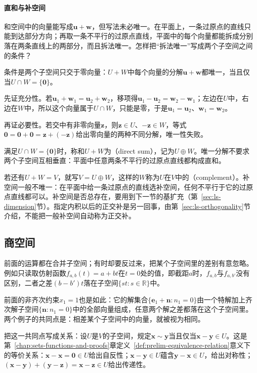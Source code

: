 \paragraph{直和与补空间}
\label{sec:ls-direct-sum}
和空间中的向量能写成$\bm u+\bm w$，但写法未必唯一。在平面上，一条过原点的直线只能到达部分方向；再取一条不平行的过原点直线，平面中的每个向量都能拆成分别落在两条直线上的两部分，而且拆法唯一。怎样把“拆法唯一”写成两个子空间之间的条件？

条件是两个子空间只交于零向量：$U+W$中每个向量的分解$\bm u+\bm w$都唯一，当且仅当$U\cap W=\{\bm0\}$。

先证充分性。若$\bm u_1+\bm w_1=\bm u_2+\bm w_2$，移项得$\bm u_1-\bm u_2=\bm w_2-\bm w_1$；左边在$U$中，右边在$W$中，所以这个向量属于$U\cap W$，只能是零，于是$\bm u_1=\bm u_2$、$\bm w_1=\bm w_2$。

再证必要性。若交中有非零向量$\bm z$，则$\bm z\in U$、$-\bm z\in W$，等式$\bm0=\bm0+\bm0=\bm z+(-\bm z)$给出零向量的两种不同分解，唯一性失败。

满足$U\cap W=\{\bm0\}$时，称和$U+W$为（direct sum），记为$U\oplus W$。唯一分解不要求两个子空间互相垂直：平面中任意两条不平行的过原点直线都构成直和。

若还有$U+W=V$，就写$V=U\oplus W$，这样的$W$称为$U$在$V$中的（complement）。补空间一般不唯一：在平面中给一条过原点的直线选补空间，任何不平行于它的过原点直线都可以。补空间是否总存在，要用到下一节的基扩充（第~\ref{sec:ls-dimension}节）。指定内积以后的正交补是另一回事，由第~\ref{sec:ls-orthogonality}节介绍，不能把一般补空间自动称为正交补。

\subsection{商空间}
\label{sec:ls-quotient-spaces}
\label{sec:linear-algebra-equivalence-relations}
前面的运算都在合并子空间；有时却要反过来，把某个子空间里的差别有意忽略。例如只读取仿射函数$f_{a,b}(t)=a+bt$在$t=0$处的值，即截距$a$时，$f_{a,b}$与$f_{a,b'}$没有区别，二者之差$(b-b')t$落在子空间$\{st:s\in\mathbb R\}$中。

前面的非齐次约束$x_1=1$也是如此：它的解集合$\{\bm e_1+\bm n:n_1=0\}$由一个特解加上齐次解子空间$\{\bm n:n_1=0\}$中的全部向量组成，任意两个解之差都落在这个子空间里。两个例子的共同点是：相差某个子空间中的向量，就被视为相同。

把这一共同点写成关系：设$U$是$V$的子空间，规定$\bm x\sim\bm y$当且仅当$\bm x-\bm y\in U$。这是第~\ref{chap:sets-functions-and-proofs}章定义~\ref{def:prelim-equivalence-relation}意义下的等价关系：$\bm x-\bm x=\bm0\in U$给出自反性；$\bm x-\bm y\in U$蕴含$\bm y-\bm x\in U$，给出对称性；$(\bm x-\bm y)+(\bm y-\bm z)=\bm x-\bm z\in U$给出传递性。

